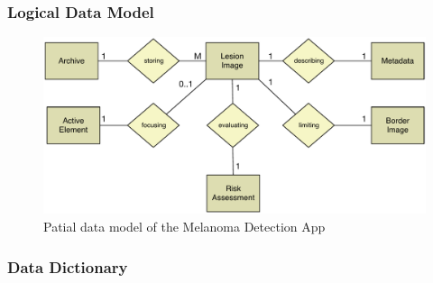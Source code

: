     
        \subsubsection{Logical Data Model}

            \begin{figure}[H]
                \centering
                \includegraphics[width=\textwidth]{assets/requirements/EntRel.pdf}
                \caption{Patial data model of the Melanoma Detection App}
                \label{fig:partial_data_model}
            \end{figure}


        \subsubsection{Data Dictionary}

